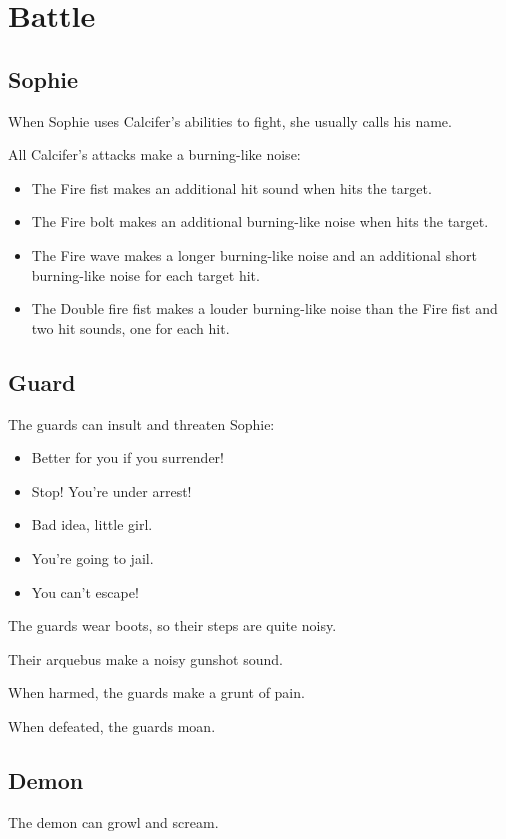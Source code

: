 \section{Battle}

\subsection{Sophie}
When Sophie uses Calcifer's abilities to fight, she usually calls his name.

All Calcifer's attacks make a burning-like noise:

\begin{itemize}
\item The Fire fist makes an additional hit sound when hits the target.
\item The Fire bolt makes an additional burning-like noise when hits the target.
\item The Fire wave makes a longer burning-like noise and an additional short burning-like noise for each target hit.
\item The Double fire fist makes a louder burning-like noise than the Fire fist and two hit sounds, one for each hit.
\end{itemize}


\subsection{Guard}
The guards can insult and threaten Sophie:
\begin{itemize}
	\item Better for you if you surrender!
	\item Stop! You're under arrest!
	\item Bad idea, little girl.
	\item You're going to jail.
	\item You can't escape!
\end{itemize}

The guards wear boots, so their steps are quite noisy.

Their arquebus make a noisy gunshot sound.

When harmed, the guards make a grunt of pain.

When defeated, the guards moan.

\subsection{Demon}
The demon can growl and scream.

